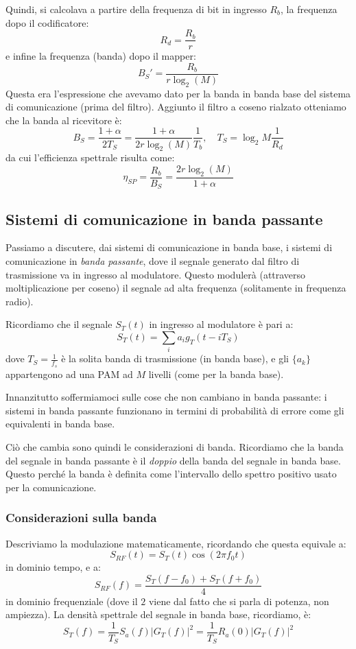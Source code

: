 \documentclass[a4paper,11pt]{article}
\begin{document}
Quindi, si calcolava a partire della frequenza di bit in ingresso $R_b$, la frequenza dopo il codificatore:
$$
R_d = \frac{R_b}{r}
$$
e infine la frequenza (banda) dopo il mapper:
$$
B_S'= \frac{R_b}{r \log_2 ( M)}
$$
Questa era l'espressione che avevamo dato per la banda in banda base del sistema di comunicazione (prima del filtro).
Aggiunto il filtro a coseno rialzato otteniamo che la banda al ricevitore è:
$$
B_S = \frac{1 + \alpha}{2 T_S} = \frac{1 + \alpha}{2 r \log_2 (M)} \frac{1}{T_b}, \quad T_S = \log_2M \frac{1}{R_d}
$$
da cui l'efficienza spettrale risulta come:
$$
\eta_{SP} = \frac{R_b}{B_S} = \frac{2 r \log_2(M)}{1 + \alpha}
$$

\subsection{Sistemi di comunicazione in banda passante}
Passiamo a discutere, dai sistemi di comunicazione in banda base, i sistemi di comunicazione in \textit{banda passante}, dove il segnale generato dal filtro di trasmissione va in ingresso al modulatore. Questo modulerà (attraverso moltiplicazione per coseno) il segnale ad alta frequenza (solitamente in frequenza radio).

Ricordiamo che il segnale $S_T(t)$ in ingresso al modulatore è pari a:
$$
S_T(t) = \sum_i a_i g_T(t - i T_S)
$$
dove $T_S = \frac{1}{f_s}$ è la solita banda di trasmissione (in banda base), e gli $\{a_k\}$ appartengono ad una PAM ad $M$ livelli (come per la banda base).

Innanzitutto soffermiamoci sulle cose che non cambiano in banda passante: i sistemi in banda passante funzionano in termini di probabilità di errore come gli equivalenti in banda base.

Ciò che cambia sono quindi le considerazioni di banda. Ricordiamo che la banda del segnale in banda passante è il \textit{doppio} della banda del segnale in banda base. Questo perché la banda è definita come l'intervallo dello spettro positivo usato per la comunicazione.

\subsubsection{Considerazioni sulla banda}

Descriviamo la modulazione matematicamente, ricordando che questa equivale a:
$$
S_{RF}(t) = S_T(t) \cos(2 \pi f_0 t)
$$
in dominio tempo, e a:
$$
S_{RF}(f) = \frac{S_T(f - f_0) + S_T(f + f_0)}{4}
$$
in dominio frequenziale (dove il $2$ viene dal fatto che si parla di potenza, non ampiezza). 
La densità spettrale del segnale in banda base, ricordiamo, è:
$$
S_T(f) = \frac{1}{T_S} S_a(f) | G_T(f) |^2 = \frac{1}{T_S} R_a(0) | G_T(f) |^2
$$
\end{document}
